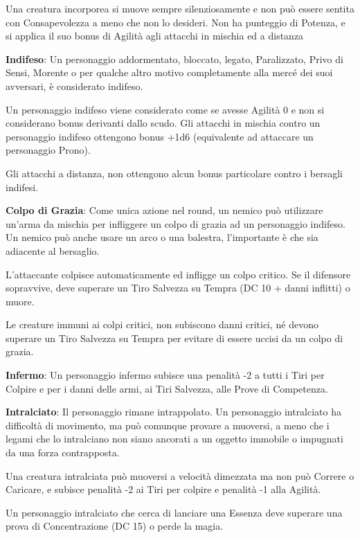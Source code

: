 \documentclass[a4paper,11pt,twoside,openany]{book}
\begin{document}
Una creatura incorporea si muove sempre silenziosamente e non può essere sentita con Consapevolezza a meno che non lo desideri. Non ha punteggio di Potenza, e si applica il suo bonus di Agilità agli attacchi in mischia ed a distanza

\textbf{Indifeso}: Un personaggio addormentato, bloccato, legato, Paralizzato, Privo di Sensi, Morente o per qualche altro motivo completamente alla mercé dei suoi avversari, è considerato indifeso.

Un personaggio indifeso viene considerato come se avesse Agilità 0 e non si considerano bonus derivanti dallo scudo. Gli attacchi in mischia contro un personaggio indifeso ottengono bonus +1d6 (equivalente ad attaccare un personaggio Prono).

Gli attacchi a distanza, non ottengono alcun bonus particolare contro i bersagli indifesi.

\textbf{Colpo di Grazia}: Come unica azione nel round, un nemico può utilizzare un'arma da mischia per infliggere un colpo di grazia ad un personaggio indifeso. Un nemico può anche usare un arco o una balestra, l'importante è che sia adiacente al bersaglio.

L'attaccante colpisce automaticamente ed infligge un colpo critico. Se il difensore sopravvive, deve superare un Tiro Salvezza su Tempra (DC 10 + danni inflitti) o muore.

Le creature immuni ai colpi critici, non subiscono danni critici, né devono superare un Tiro Salvezza su Tempra per evitare di essere uccisi da un colpo di grazia.

\textbf{Infermo}: Un personaggio infermo subisce una penalità -2 a tutti i Tiri per Colpire e per i danni delle armi, ai Tiri Salvezza, alle Prove di Competenza.

\textbf{Intralciato}: Il personaggio rimane intrappolato. Un personaggio intralciato ha difficoltà di movimento, ma può comunque provare a muoversi, a meno che i legami che lo intralciano non siano ancorati a un oggetto immobile o impugnati da una forza contrapposta.

Una creatura intralciata può muoversi a velocità dimezzata ma non può Correre o Caricare, e subisce penalità -2 ai Tiri per colpire e penalità -1 alla Agilità.

Un personaggio intralciato che cerca di lanciare una Essenza deve superare una prova di Concentrazione (DC 15) o perde la magia.
\end{document}
